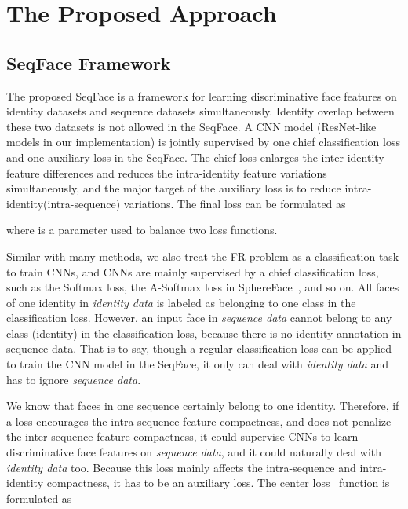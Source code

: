 \documentclass[conference]{acmsiggraph}
\begin{document}
\section{The Proposed Approach}
\label{sec:proposed}

\subsection{SeqFace Framework}
The proposed SeqFace is a framework for learning discriminative face features on identity datasets and sequence datasets simultaneously. \iffalse In \emph{identity data}, faces of one identity are labeled as the same . In \emph{sequence data}, faces in one sequence are labeled as the same . Two faces with the different  must belong to different identities, but two faces with the different  might (or might not) belong to one identity. \fi Identity overlap between these two datasets is not allowed in the SeqFace. A CNN model (ResNet-like models in our implementation) is jointly supervised by one chief classification loss and one auxiliary loss in the SeqFace. The chief loss enlarges the inter-identity feature differences and reduces the intra-identity feature variations simultaneously, and the major target of the auxiliary loss is to reduce intra-identity(intra-sequence) variations. The final loss can be formulated as

where  is a parameter used to balance two loss functions.

Similar with many methods, we also treat the FR problem as a classification task to train CNNs, and CNNs are mainly supervised by a chief classification loss, such as the Softmax loss, the A-Softmax loss in SphereFace~\cite{sphereface}, and so on. All faces of one identity in \emph{identity data} is labeled as belonging to one class in the classification loss. However, an input face in \emph{sequence data} cannot belong to any class (identity) in the classification loss, because there is no identity annotation in sequence data. That is to say, though a regular classification loss can be applied to train the CNN model in the SeqFace, it only can deal with \emph{identity data} and has to ignore \emph{sequence data}. 

We know that faces in one sequence certainly belong to one identity. Therefore, if a loss encourages the intra-sequence feature compactness, and does not penalize the inter-sequence feature compactness, it could supervise CNNs to learn discriminative face features on \emph{sequence data}, and it could naturally deal with \emph{identity data} too. Because this loss mainly affects the intra-sequence and intra-identity compactness, it has to be an auxiliary loss. The center loss~\cite{centerloss} function is formulated as
\end{document}
